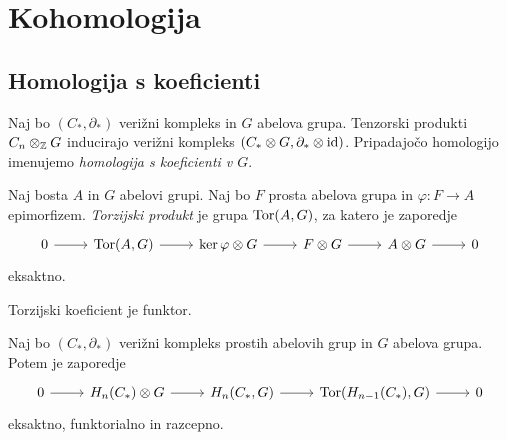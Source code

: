 \section{Kohomologija}

\subsection{Homologija s koeficienti}


\begin{definicija}
Naj bo $(C_*, \partial_*)$ verižni kompleks in $G$ abelova grupa.
Tenzorski produkti $C_n \otimes_{\mathbb{Z}} G$ inducirajo verižni kompleks
$(C_* \otimes G, \partial_* \otimes \operatorname{id})$. Pripadajočo homologijo
imenujemo
\emph{homologija s koeficienti v $G$}.
\end{definicija}

\begin{definicija}
Naj bosta $A$ in $G$ abelovi grupi. Naj bo $F$ prosta abelova grupa
in $\varphi \colon F \to A$ epimorfizem.
\emph{Torzijski produkt} je grupa
$\operatorname{Tor}(A, G)$, za katero je zaporedje
\[
\begin{tikzcd}
0 \arrow[r] &
\Tor(A, G) \arrow[r] &
\ker \varphi \otimes G \arrow[r] &
F \otimes G \arrow[r] &
A \otimes G \arrow[r] &
0
\end{tikzcd}
\]
eksaktno.
\end{definicija}

\begin{opomba}
Torzijski koeficient je funktor.
\end{opomba}

\begin{izrek}
Naj bo $(C_*, \partial_*)$ verižni kompleks prostih abelovih grup
in $G$ abelova grupa. Potem je zaporedje
\[
\begin{tikzcd}
0 \arrow[r] &
H_n(C_*) \otimes G \arrow[r] &
H_n(C_*, G) \arrow[r] &
\Tor(H_{n-1}(C_*), G) \arrow[r] &
0
\end{tikzcd}
\]
eksaktno, funktorialno in razcepno.
\end{izrek}

